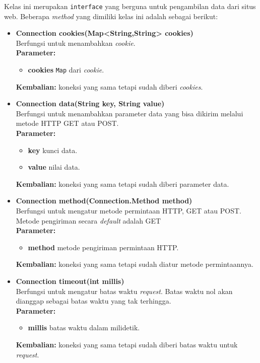 Kelas ini merupakan \texttt{interface} yang berguna untuk pengambilan data dari situs web. Beberapa \textit{method} yang dimiliki kelas ini adalah sebagai berikut:

\begin{itemize}
	\item \textbf{Connection cookies(Map<String,String> cookies)} \\
		Berfungsi untuk menambahkan \textit{cookie}. \\
		\textbf{Parameter:}
		\begin{itemize}
			\item \textbf{cookies} \texttt{Map} dari \textit{cookie}.
		\end{itemize}
		\textbf{Kembalian:} koneksi yang sama tetapi sudah diberi \textit{cookies}.
		
		\item \textbf{Connection data(String key, String value)} \\
		Berfungsi untuk menambahkan parameter data yang bisa dikirim melalui metode HTTP GET atau POST. \\
		\textbf{Parameter:}
		\begin{itemize}
			\item \textbf{key} kunci data.
			\item \textbf{value} nilai data.
		\end{itemize}
		\textbf{Kembalian:} koneksi yang sama tetapi sudah diberi parameter data.
		
		\item \textbf{Connection method(Connection.Method method)} \\
		Berfungsi untuk mengatur metode permintaan HTTP, GET atau POST. Metode pengiriman secara \textit{default} adalah GET\\
		\textbf{Parameter:}
		\begin{itemize}
			\item \textbf{method} metode pengiriman permintaan HTTP.
		\end{itemize}
		\textbf{Kembalian:} koneksi yang sama tetapi sudah diatur metode permintaannya.
		
		\item \textbf{Connection timeout(int millis)} \\
		Berfungsi untuk mengatur batas waktu \textit{request}. Batas waktu nol akan dianggap sebagai batas waktu yang tak terhingga. \\
		\textbf{Parameter:}
		\begin{itemize}
			\item \textbf{millis} batas waktu dalam milidetik.
		\end{itemize}
		\textbf{Kembalian:} koneksi yang sama tetapi sudah diberi batas waktu untuk \textit{request}.
		

\end{itemize}
